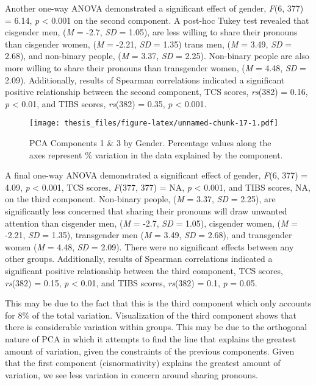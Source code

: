 \documentclass[12pt,twoside]{reedthesis}
\begin{document}
Another one-way ANOVA demonstrated a significant effect of gender, \emph{F}(6, 377) = 6.14, \emph{p} \textless{} 0.001 on the second component. A post-hoc Tukey test revealed that cisgender men, (\emph{M} = -2.7, \emph{SD} = 1.05), are less willing to share their pronouns than cisgender women, (\emph{M} = -2.21, \emph{SD} = 1.35) trans men, (\emph{M} = 3.49, \emph{SD} = 2.68), and non-binary people, (\emph{M} = 3.37, \emph{SD} = 2.25). Non-binary people are also more willing to share their pronouns than transgender women, (\emph{M} = 4.48, \emph{SD} = 2.09). Additionally, results of Spearman correlations indicated a significant positive relationship between the second component, TCS scores, \emph{rs}(382) = 0.16, \emph{p} \textless{} 0.01, and TIBS scores, \emph{rs}(382) = 0.35, \emph{p} \textless{} 0.001.
\begin{figure}
\centering
\texttt{[image: thesis\_files/figure-latex/unnamed-chunk-17-1.pdf]}
\caption{\label{fig:unnamed-chunk-17}PCA Components 1 \& 3 by Gender. Percentage values along the axes represent \% variation in the data explained by the component.}
\end{figure}
A final one-way ANOVA demonstrated a significant effect of gender, \emph{F}(6, 377) = 4.09, \emph{p} \textless{} 0.001, TCS scores, \emph{F}(377, 377) = NA, \emph{p} \textless{} 0.001, and TIBS scores, NA, on the third component. Non-binary people, (\emph{M} = 3.37, \emph{SD} = 2.25), are significantly less concerned that sharing their pronouns will draw unwanted attention than cisgender men, (\emph{M} = -2.7, \emph{SD} = 1.05), cisgender women, (\emph{M} = -2.21, \emph{SD} = 1.35), transgender men (\emph{M} = 3.49, \emph{SD} = 2.68), and transgender women (\emph{M} = 4.48, \emph{SD} = 2.09). There were no significant effects between any other groups. Additionally, results of Spearman correlations indicated a significant positive relationship between the third component, TCS scores, \emph{rs}(382) = 0.15, \emph{p} \textless{} 0.01, and TIBS scores, \emph{rs}(382) = 0.1, \emph{p} = 0.05.

This may be due to the fact that this is the third component which only accounts for 8\% of the total variation. Visualization of the third component shows that there is considerable variation within groups. This may be due to the orthogonal nature of PCA in which it attempts to find the line that explains the greatest amount of variation, given the constraints of the previous components. Given that the first component (cisnormativity) explains the greatest amount of variation, we see less variation in concern around sharing pronouns.
\end{document}
